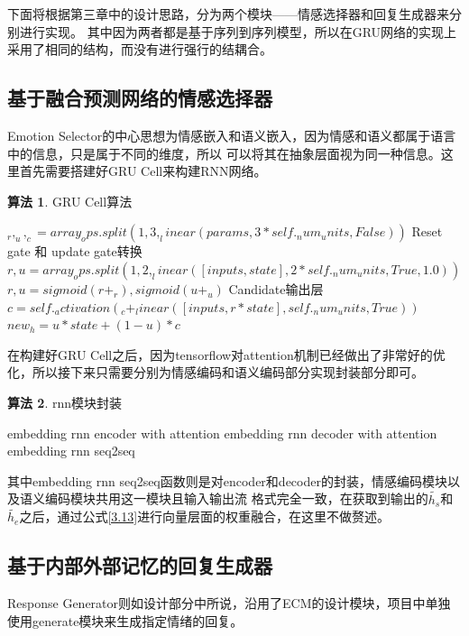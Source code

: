 \documentclass[supercite]{HustGraduPaper}
\theoremstyle{definition}
\newtheorem{alg}{算法}[section]
\begin{document}
下面将根据第三章中的设计思路，分为两个模块——情感选择器和回复生成器来分别进行实现。
其中因为两者都是基于序列到序列模型，所以在GRU网络的实现上采用了相同的结构，而没有进行强行的结耦合。

\subsection{基于融合预测网络的情感选择器}
Emotion Selector的中心思想为情感嵌入和语义嵌入，因为情感和语义都属于语言中的信息，只是属于不同的维度，所以
可以将其在抽象层面视为同一种信息。这里首先需要搭建好GRU Cell来构建RNN网络。
\begin{shaded*}
  \begin{alg}{GRU Cell算法}
  \label{alg:gru}
  \begin{algorithmic}
    \State $_r, _u, _c = array_ops.split(1, 3, _linear(params, 3 * self._num_units, False))$
    \State Reset gate 和 update gate转换
    \State $r, u = array_ops.split(1, 2, _linear([inputs, state], 2 * self._num_units, True, 1.0))$
    \State $r, u = sigmoid(r+_r), sigmoid(u+_u)$
    \State Candidate输出层
    \State $c = self._activation(_c+_linear([inputs, r * state], self._num_units, True))$
    \State $new_h = u * state + (1 - u) * c$
  \end{algorithmic}
  \end{alg}
\end{shaded*}

在构建好GRU Cell之后，因为tensorflow对attention机制已经做出了非常好的优化，所以接下来只需要分别为情感编码和语义编码部分实现封装部分即可。
\begin{shaded*}
  \begin{alg}{rnn模块封装}
  \label{alg:rnn model}
  \begin{algorithmic}
      \State embedding rnn encoder with attention
      \State embedding rnn decoder with attention
      \State embedding rnn seq2seq
  \end{algorithmic}
  \end{alg}
\end{shaded*}
其中embedding rnn seq2seq函数则是对encoder和decoder的封装，情感编码模块以及语义编码模块共用这一模块且输入输出流
格式完全一致，在获取到输出的$\widetilde{h_s}$和$\widetilde{h_e}$之后，通过公式\ref{3.13}进行向量层面的权重融合，在这里不做赘述。

\subsection{基于内部外部记忆的回复生成器}
Response Generator则如设计部分中所说，沿用了ECM\cite{DBLP:journals/corr/ZhouHZZL17}的设计模块，项目中单独使用generate模块来生成指定情绪的回复。
\end{document}
